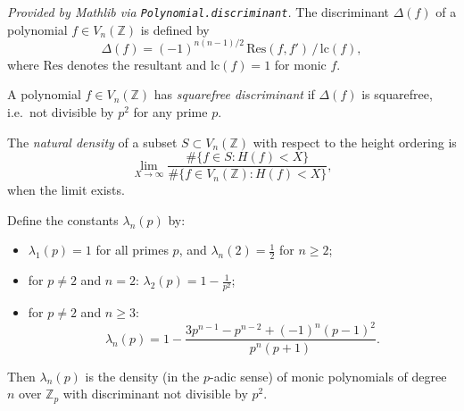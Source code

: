 \begin{definition}[Discriminant]
  \label{def:discriminant}
  \textit{Provided by Mathlib via \texttt{Polynomial.discriminant}.}
  The discriminant \(\Delta(f)\) of a polynomial \(f\in V_n(\mathbb{Z})\)
  is defined by
  \[
    \Delta(f) = (-1)^{n(n-1)/2}\,\mathrm{Res}(f,f')\,/\,\mathrm{lc}(f),
  \]
  where \(\mathrm{Res}\) denotes the resultant and \(\mathrm{lc}(f)=1\)
  for monic \(f\).
\end{definition}

\begin{definition}
  \label{def:squarefree_disc}
  A polynomial \(f\in V_n(\mathbb{Z})\) has \emph{squarefree
  discriminant} if \(\Delta(f)\) is squarefree, i.e.\ not divisible
  by \(p^2\) for any prime \(p\).
\end{definition}

\begin{definition}
  \label{def:natural_density}
  The \emph{natural density} of a subset \(S\subset V_n(\mathbb{Z})\)
  with respect to the height ordering is
  \[
    \lim_{X\to\infty}
      \frac{\#\{f\in S : H(f)<X\}}
           {\#\{f\in V_n(\mathbb{Z}) : H(f)<X\}},
  \]
  when the limit exists.
\end{definition}

\begin{definition}
  \label{def:local_density}
  Define the constants \(\lambda_n(p)\) by:
  \begin{itemize}
    \item \(\lambda_1(p)=1\) for all primes \(p\), and
          \(\lambda_n(2)=\tfrac12\) for \(n\geq 2\);
    \item for \(p\neq 2\) and \(n=2\): \(\lambda_2(p)=1-\tfrac{1}{p^2}\);
    \item for \(p\neq 2\) and \(n\geq 3\):
      \[
        \lambda_n(p)=1-\frac{3p^{n-1}-p^{n-2}+(-1)^n(p-1)^2}{p^n(p+1)}.
      \]
  \end{itemize}
  Then \(\lambda_n(p)\) is the density (in the \(p\)-adic sense) of
  monic polynomials of degree \(n\) over \(\mathbb{Z}_p\) with
  discriminant not divisible by \(p^2\).
\end{definition}

